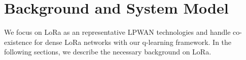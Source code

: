  \section{Background and System Model}
 We focus on LoRa as an representative LPWAN technologies and handle co-existence for dense LoRa networks with our q-learning framework. In the following sections, we describe the necessary background on LoRa. 
  

 
 
 




